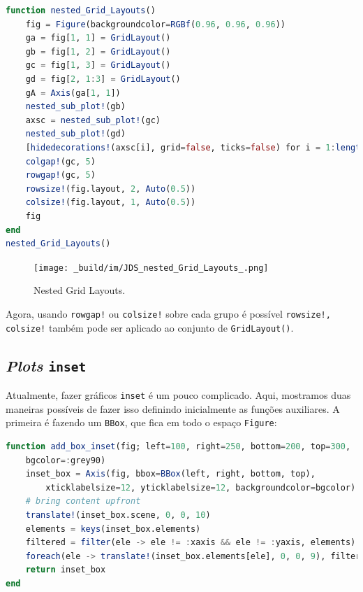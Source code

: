 \documentclass[
  notoc %
]{tufte-book}
\newcommand{\passthrough}[1]{#1}
\begin{document}
\begin{lstlisting}[language=Julia]
function nested_Grid_Layouts()
    fig = Figure(backgroundcolor=RGBf(0.96, 0.96, 0.96))
    ga = fig[1, 1] = GridLayout()
    gb = fig[1, 2] = GridLayout()
    gc = fig[1, 3] = GridLayout()
    gd = fig[2, 1:3] = GridLayout()
    gA = Axis(ga[1, 1])
    nested_sub_plot!(gb)
    axsc = nested_sub_plot!(gc)
    nested_sub_plot!(gd)
    [hidedecorations!(axsc[i], grid=false, ticks=false) for i = 1:length(axsc)]
    colgap!(gc, 5)
    rowgap!(gc, 5)
    rowsize!(fig.layout, 2, Auto(0.5))
    colsize!(fig.layout, 1, Auto(0.5))
    fig
end
nested_Grid_Layouts()
\end{lstlisting}

\begin{figure}
\hypertarget{fig:nested_Grid_Layouts}{%
\centering
\texttt{[image: \_build/im/JDS\_nested\_Grid\_Layouts\_.png]}
\caption{Nested Grid Layouts.}\label{fig:nested_Grid_Layouts}
}
\end{figure}

Agora, usando \passthrough{\lstinline"rowgap!"} ou
\passthrough{\lstinline"colsize!"} sobre cada grupo é possível
\passthrough{\lstinline"rowsize!, colsize!"} também pode ser aplicado ao
conjunto de \passthrough{\lstinline!GridLayout()!}.

\hypertarget{plots-inset}{%
\subsection{\texorpdfstring{\emph{Plots}
\texttt{inset}}{Plots inset}}\label{plots-inset}}

Atualmente, fazer gráficos \passthrough{\lstinline!inset!} é um pouco
complicado. Aqui, mostramos duas maneiras possíveis de fazer isso
definindo inicialmente as funções auxiliares. A primeira é fazendo um
\passthrough{\lstinline!BBox!}, que fica em todo o espaço
\passthrough{\lstinline!Figure!}:

\begin{lstlisting}[language=Julia]
function add_box_inset(fig; left=100, right=250, bottom=200, top=300,
    bgcolor=:grey90)
    inset_box = Axis(fig, bbox=BBox(left, right, bottom, top),
        xticklabelsize=12, yticklabelsize=12, backgroundcolor=bgcolor)
    # bring content upfront
    translate!(inset_box.scene, 0, 0, 10)
    elements = keys(inset_box.elements)
    filtered = filter(ele -> ele != :xaxis && ele != :yaxis, elements)
    foreach(ele -> translate!(inset_box.elements[ele], 0, 0, 9), filtered)
    return inset_box
end
\end{lstlisting}
\end{document}

